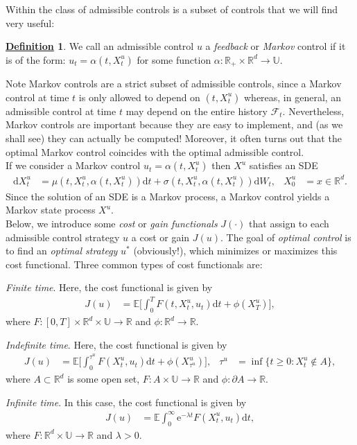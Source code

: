\documentclass[12pt]{book}
\let\varphi\phi
\numberwithin{equation}{chapter}
\theoremstyle{plain}
\numberwithin{theorem}{section}
\theoremstyle{definition}
\newtheorem{definition}[theorem]{\underline{Definition}}
\numberwithin{exercise}{chapter}
\newcommand{\<}{\langle}
\renewcommand{\>}{\rangle}
\renewcommand{\(}{\left(}
\renewcommand{\)}{\right)}
\renewcommand{\[}{\left[}
\renewcommand{\]}{\right]}
\newcommand\Eb{\mathds{E}}
\newcommand\Rb{\mathds{R}}
\newcommand\Ub{\mathds{U}}
\newcommand\Fc{\mathscr{F}}
\newcommand\sig{\sigma}
\newcommand\lam{\lambda}
\renewcommand\d{\partial}
\newcommand\dd{\mathrm{d}}
\newcommand\ee{\mathrm{e}}
\begin{document}
\noindent
Within the class of admissible controls is a subset of controls that we will find very useful:

\begin{definition}
We call an admissible control $u$ a \emph{feedback} or \emph{Markov} control if it is of the form: $u_t = \alpha(t,X_t^u)$ for some function $\alpha : \Rb_+ \times \Rb^d \to \Ub$. 
\end{definition}

\noindent
Note Markov controls are a strict subset of admissible controls, since a Markov control at time $t$ is only allowed to depend on $(t,X_t^u)$ whereas, in general, an admissible control at time $t$ may depend on the entire history $\Fc_t$.  Nevertheless, Markov controls are important because they are easy to implement, and (as we shall see) they can actually be computed!  Moreover, it often turns out that the optimal Markov control coincides with the optimal admissible control.
\\[0.5em]
If we consider a Markov control $u_t = \alpha(t,X_t^u)$ then $X^u$ satisfies an SDE
\begin{align}
\dd X_t^u
	&=	\mu(t,X_t^u,\alpha(t,X_t^u)) \dd t + \sig(t,X_t^u,\alpha(t,X_t^u)) \dd W_t , &
X_0^u
	&=	x \in \Rb^d .
\end{align}
Since the solution of an SDE is a Markov process, a Markov control yields a Markov state process $X^u$.
\\[0.5em]
Below, we introduce some \emph{cost} or \emph{gain functionals} $J(\cdot)$ that assign to each admissible control strategy $u$ a cost or gain $J(u)$. The goal of \emph{optimal control} is to find an \emph{optimal strategy} $u^*$ (obviously!), which minimizes or maximizes this cost functional.  
Three common types of cost functionals are:
\begin{enumerate*}
\item \emph{Finite time}.  Here, the cost functional is given by
\begin{align}
J(u)
	&=	\Eb \Big[ \int_0^T F(t,X_t^u,u_t) \dd t + \varphi(X_T^u) \Big] , \label{eq:finite.time}
\end{align}
where $F: [0,T] \times \Rb^d \times \Ub \to \Rb$ and $\varphi : \Rb^d \to \Rb$.
\item \emph{Indefinite time}.  Here, the cost functional is given by
\begin{align}
J(u)
	&=	\Eb \Big[ \int_0^{\tau^u} F(X_t^u,u_t) \dd t +  \varphi(X_{\tau^u}^u) \Big], &
\tau^u
	&=	\inf\{ t \geq 0 : X_t^u \notin A \} ,
\end{align}
where $A \subset \Rb^d$ is some open set, $F: A \times \Ub \to \Rb$ and $\varphi : \d A \to \Rb$.
\item \emph{Infinite time}.  In this case, the cost functional is given by
\begin{align}
J(u)
	&=	\Eb \int_0^\infty \ee^{- \lam t} F(X_t^u,u_t) \dd t ,
\end{align}
where $F : \Rb^d \times \Ub \to \Rb$ and $\lam > 0$.
\end{enumerate*}
\end{document}
